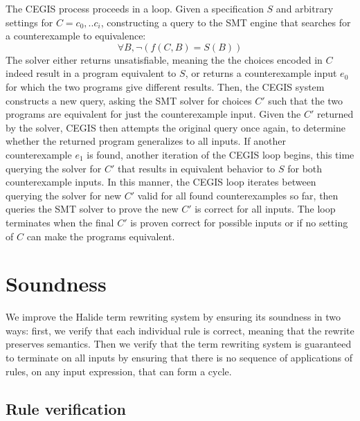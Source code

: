 \documentclass[acmsmall,review,anonymous]{acmart}\settopmatter{printfolios=true,printccs=false,printacmref=false}
\begin{document}
The CEGIS process proceeds in a loop. Given a specification $S$ and arbitrary
settings for $C = {c_0,..c_i}$, constructing a query to the SMT engine that searches for
a counterexample to equivalence:
$$\forall B, \neg (f(C, B) = S(B))$$
The solver either returns unsatisfiable, meaning the the choices encoded in $C$
indeed result in a program equivalent to $S$, or returns a counterexample input $e_0$
for which the two programs give different results.  Then, the CEGIS system constructs a new query,
asking the SMT solver for choices $C'$ such that the two programs are equivalent for just the
counterexample input.
Given the $C'$ returned by the solver, CEGIS then attempts the original query once again, to
determine whether the returned program generalizes to all inputs.
If another counterexample $e_1$ is found, another iteration of the CEGIS loop begins, this time querying
the solver for $C'$ that results in equivalent behavior to $S$ for both counterexample inputs.
In this manner, the CEGIS loop iterates between querying the solver for new $C'$ valid
for all found counterexamples so far, then queries the SMT solver to prove the new $C'$ is
correct for all inputs.  The loop terminates when the final $C'$ is proven correct for
possible inputs or if no setting of $C$ can make the programs equivalent.

\section{Soundness}
\label{sec:soundness}

We improve the Halide term rewriting system by ensuring its soundness in
two ways: first, we verify that each individual rule is correct, meaning that the
rewrite preserves semantics. Then we verify that the term rewriting system is
guaranteed to terminate on all inputs by ensuring that there is no sequence of
applications of rules, on any input expression, that can form a cycle.

\subsection{Rule verification}
\end{document}
